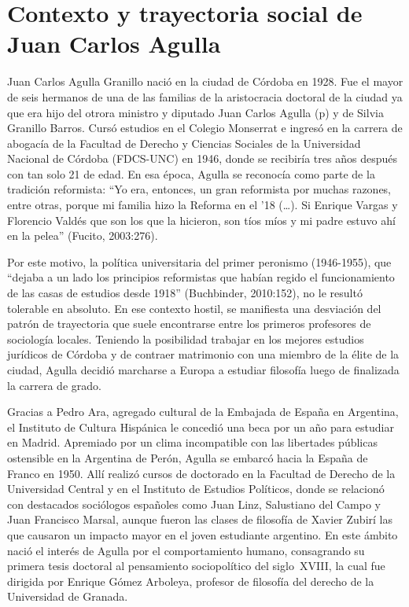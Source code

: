 \section{Contexto y trayectoria social de Juan Carlos Agulla}

Juan Carlos Agulla Granillo nació en la ciudad de Córdoba en 1928. Fue el mayor de seis hermanos de una de las familias de la aristocracia doctoral de la ciudad ya que era hijo del otrora ministro y diputado Juan Carlos Agulla (p) y de Silvia Granillo Barros. Cursó estudios en el Colegio Monserrat e ingresó en la carrera de abogacía de la Facultad de Derecho y Ciencias Sociales de la Universidad Nacional de Córdoba (FDCS-UNC) en 1946, donde se recibiría tres años después con tan solo 21 de edad. En esa época, Agulla se reconocía como parte de la tradición reformista: ``Yo era, entonces, un gran reformista por muchas razones, entre otras, porque mi familia hizo la Reforma en el '18 (\dots). Si Enrique Vargas y Florencio Valdés que son los que la hicieron, son tíos míos y mi padre estuvo ahí en la pelea'' (Fucito, 2003:276).

Por este motivo, la política universitaria del primer peronismo (1946-1955), que ``dejaba a un lado los principios reformistas que habían regido el funcionamiento de las casas de estudios desde 1918'' (Buchbinder, 2010:152), no le resultó tolerable en absoluto. En ese contexto hostil, se manifiesta una desviación del patrón de trayectoria que suele encontrarse entre los primeros profesores de sociología locales. Teniendo la posibilidad trabajar en los mejores estudios jurídicos de Córdoba y de contraer matrimonio con una miembro de la élite de la ciudad, Agulla decidió marcharse a Europa a estudiar filosofía luego de finalizada la carrera de grado.

Gracias a Pedro Ara, agregado cultural de la Embajada de España en Argentina, el Instituto de Cultura Hispánica le concedió una beca por un año para estudiar en Madrid. Apremiado por un clima incompatible con las libertades públicas ostensible en la Argentina de Perón, Agulla se embarcó hacia la España de Franco en 1950. Allí realizó cursos de doctorado en la Facultad de Derecho de la Universidad Central y en el Instituto de Estudios Políticos, donde se relacionó con destacados sociólogos españoles como Juan Linz, Salustiano del Campo y Juan Francisco Marsal, aunque fueron las clases de filosofía de Xavier Zubirí las que causaron un impacto mayor en el joven estudiante argentino. En este ámbito nació el interés de Agulla por el comportamiento humano, consagrando su primera tesis doctoral al pensamiento sociopolítico del siglo~XVIII, la cual fue dirigida por Enrique Gómez Arboleya, profesor de filosofía del derecho de la Universidad de Granada.

